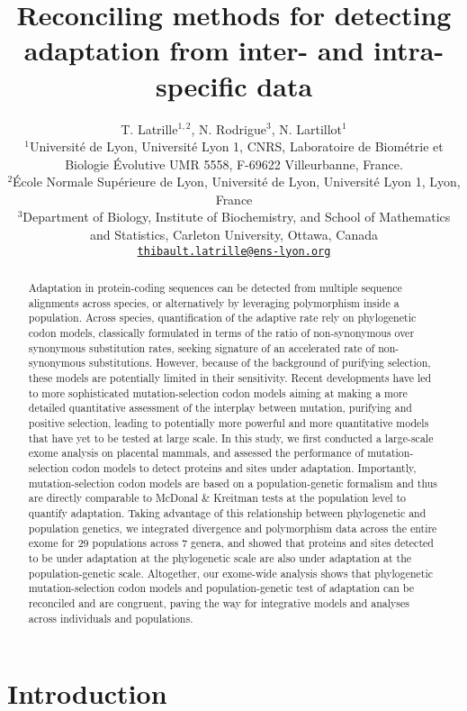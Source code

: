\documentclass{article}
\title{Reconciling methods for detecting adaptation from inter- and intra-specific data}
\author{
	\large
	T. {Latrille}$^{1,2}$, N. {Rodrigue}$^{3}$, N. {Lartillot}$^{1}$\\
	\normalsize
	$^{1}$Université de Lyon, Université Lyon 1, CNRS, Laboratoire de Biométrie et Biologie Évolutive UMR 5558, F-69622 Villeurbanne, France.\\
	$^{2}$École Normale Supérieure de Lyon, Université de Lyon, Université Lyon 1, Lyon, France\\
	$^{3}$Department of Biology, Institute of Biochemistry, and School of Mathematics and Statistics, Carleton University, Ottawa, Canada \\
	\texttt{\href{mailto:thibault.latrille@ens-lyon.org}{thibault.latrille@ens-lyon.org}} \\
}
\begin{document}
\maketitle

\begin{abstract}
	Adaptation in protein-coding sequences can be detected from multiple sequence alignments across species, or alternatively by leveraging polymorphism inside a population.
	Across species, quantification of the adaptive rate rely on phylogenetic codon models, classically formulated in terms of the ratio of non-synonymous over synonymous substitution rates, seeking signature of an accelerated rate of non-synonymous substitutions.
	However, because of the background of purifying selection, these models are potentially limited in their sensitivity.
	Recent developments have led to more sophisticated mutation-selection codon models aiming at making a more detailed quantitative assessment of the interplay between mutation, purifying and positive selection, leading to potentially more powerful and more quantitative models that have yet to be tested at large scale.
	In this study, we first conducted a large-scale exome analysis on placental mammals, and assessed the performance of mutation-selection codon models to detect proteins and sites under adaptation.
	Importantly, mutation-selection codon models are based on a population-genetic formalism and thus are directly comparable to McDonal \& Kreitman tests at the population level to quantify adaptation.
	Taking advantage of this relationship between phylogenetic and population genetics, we integrated divergence and polymorphism data across the entire exome for 29 populations across 7 genera, and showed that proteins and sites detected to be under adaptation at the phylogenetic scale are also under adaptation at the population-genetic scale.
	Altogether, our exome-wide analysis shows that phylogenetic mutation-selection codon models and population-genetic test of adaptation can be reconciled and are congruent, paving the way for integrative models and analyses across individuals and populations.
\end{abstract}


\section*{Introduction}
\end{document}
